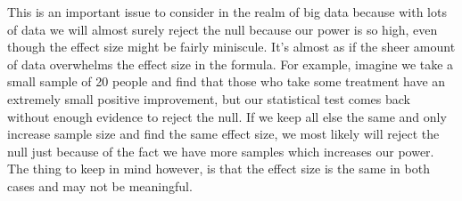 This is an important issue to consider in the realm of big data because with lots of data we will almost surely reject the null because our power is so high, even though the effect size might be fairly miniscule. It's almost as if the sheer amount of data overwhelms the effect size in the formula. For example, imagine we take a small sample of 20 people and find that those who take some treatment have an extremely small positive improvement, but our statistical test comes back without enough evidence to reject the null. If we keep all else the same and only increase sample size and find the same effect size, we most likely will reject the null just because of the fact we have more samples which increases our power. The thing to keep in mind however, is that the effect size is the same in both cases and may not be meaningful. 







